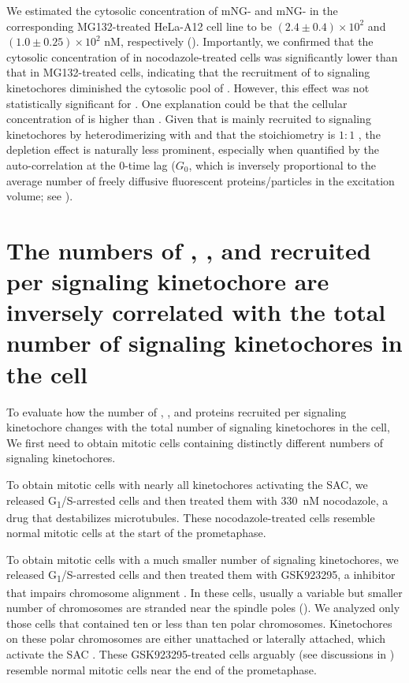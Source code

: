 We estimated the cytosolic concentration of mNG- and mNG- in the corresponding MG132-treated HeLa-A12 cell line to be $(2.4 \pm 0.4) \times 10^2$ and $(1.0 \pm 0.25) \times 10^2$ nM, respectively (). Importantly, we confirmed that the cytosolic concentration of  in nocodazole-treated cells was significantly lower than that in MG132-treated cells, indicating that the recruitment of  to signaling kinetochores diminished the cytosolic pool of . However, this effect was not statistically significant for . One explanation could be that the cellular concentration of  is higher than . Given that  is mainly recruited to signaling kinetochores by heterodimerizing with  and that the stoichiometry is $1:1$  \cite{BubBiochem}, the depletion effect is naturally less prominent, especially when quantified by the auto-correlation at the 0-time lag ($G_0$, which is inversely proportional to the average number of freely diffusive fluorescent proteins/particles in the excitation volume; see ).

\section{The numbers of , , and  recruited per signaling kinetochore are inversely correlated with the total number of signaling kinetochores in the cell}

To evaluate how the number of , , and  proteins recruited per signaling kinetochore changes with the total number of signaling kinetochores in the cell, We first need to obtain mitotic cells containing distinctly different numbers of signaling kinetochores.

To obtain mitotic cells with nearly all kinetochores activating the SAC, we released G\textsubscript{1}/S-arrested cells and then treated them with \SI{330}{nM} nocodazole, a drug that destabilizes microtubules. These nocodazole-treated cells resemble normal mitotic cells at the start of the prometaphase.

To obtain mitotic cells with a much smaller number of signaling kinetochores, we released G\textsubscript{1}/S-arrested cells and then treated them with GSK923295, a  inhibitor that impairs chromosome alignment \cite{GSK923295}. In these cells, usually a variable but smaller number of chromosomes are stranded near the spindle poles (). We analyzed only those cells that contained ten or less than ten polar chromosomes. Kinetochores on these polar chromosomes are either unattached or laterally attached, which activate the SAC \cite{GSK923295LateralAttachmentEM, GSK923295MonastrolCotreatment}. These GSK923295-treated cells arguably (see discussions in ) resemble normal mitotic cells near the end of the prometaphase.

